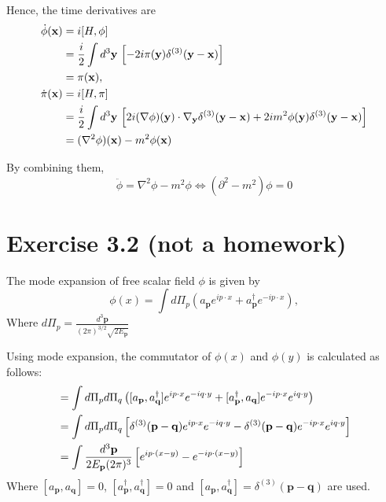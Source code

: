 \documentclass[a4paper,11pt]{article}
\begin{document}
Hence, the time derivatives are
\begin{align}
    \dot{\phi}(\mathbf{x}) 
    &= i[H, \phi] \notag\\
    &= \frac{i}{2}\int d^3\mathbf{y}\, \left[-2i\pi(\mathbf{y})\delta^{(3)}(\mathbf{y}-\mathbf{x})\right] \notag\\
    &= \pi(\mathbf{x}), \\
    \dot{\pi}(\mathbf{x}) 
    &= i[H,\pi] \notag\\
    &= \frac{i}{2}\int d^3\mathbf{y}\, \left[2i(\nabla\phi)(\mathbf{y})\cdot\nabla_{\mathbf{y}}\delta^{(3)}(\mathbf{y}-\mathbf{x}) + 2im^2\phi(\mathbf{y})\delta^{(3)}(\mathbf{y}-\mathbf{x})\right] \notag\\
    &= (\nabla^2\phi)(\mathbf{x}) - m^2\phi(\mathbf{x})
\end{align}

By combining them,
\begin{equation}
\ddot{\phi} = \nabla^2\phi -m^2\phi \iff (\partial^2 - m^2)\phi=0
\end{equation}




\section{Exercise 3.2 (not a homework)}

The mode expansion of free scalar field $\phi$ is given by
\begin{equation}
    \phi(x) = \int d\Pi_p\left(a_{\mathbf{p}}e^{ip\cdot x} + a_{\mathbf{p}}^\dagger e^{-ip\cdot x}\right),
\end{equation}
Where $d\Pi_p = \frac{d^3\mathbf{p}}{(2\pi)^{3/2}\sqrt{2E_{\mathbf{p}}}}$

Using mode expansion, the commutator of $\phi(x)$ and $\phi(y)$ is calculated as follows:
\begin{align}
    [\phi(x), \phi(y)] &= \int d\Pi_p d\Pi_q \left([a_{\mathbf{p}}, a_{\mathbf{q}}^\dagger]e^{ip\cdot x}e^{-iq\cdot y} + [a_{\mathbf{p}}^\dagger, a_{\mathbf{q}}]e^{-ip\cdot x}e^{iq\cdot y}\right) \notag\\
    &= \int d\Pi_p d\Pi_q \left[\delta^{(3)}(\mathbf{p}-\mathbf{q})e^{ip\cdot x}e^{-iq\cdot y} - \delta^{(3)}(\mathbf{p}-\mathbf{q})e^{-ip\cdot x}e^{iq\cdot y}\right] \notag\\
    &=\int \frac{d^3\mathbf{p}}{2E_{\mathbf{p}}(2\pi)^{3}} \left[e^{ip\cdot (x-y)} - e^{-ip\cdot (x-y)}\right] \label{eq:commutator}
\end{align} 
Where $[a_{\mathbf{p}}, a_{\mathbf{q}}] = 0$, $[a_{\mathbf{p}}^\dagger, a_{\mathbf{q}}^\dagger] = 0$ and $[a_{\mathbf{p}}, a_{\mathbf{q}}^\dagger] = \delta^{(3)}(\mathbf{p}-\mathbf{q})$ are used.
\end{document}
